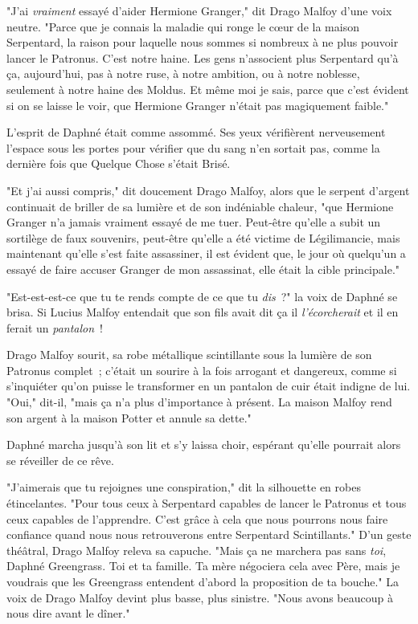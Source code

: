 "J'ai \emph{vraiment} essayé d'aider Hermione Granger," dit Drago Malfoy d'une voix neutre. "Parce que je connais la maladie qui ronge le cœur de la maison Serpentard, la raison pour laquelle nous sommes si nombreux à ne plus pouvoir lancer le Patronus. C'est notre haine. Les gens n'associent plus Serpentard qu'à ça, aujourd'hui, pas à notre ruse, à notre ambition, ou à notre noblesse, seulement à notre haine des Moldus. Et même moi je sais, parce que c'est évident si on se laisse le voir, que Hermione Granger n'était pas magiquement faible."

L'esprit de Daphné était comme assommé. Ses yeux vérifièrent nerveusement l'espace sous les portes pour vérifier que du sang n'en sortait pas, comme la dernière fois que Quelque Chose s'était Brisé.

"Et j'ai aussi compris," dit doucement Drago Malfoy, alors que le serpent d'argent continuait de briller de sa lumière et de son indéniable chaleur, "que Hermione Granger n'a jamais vraiment essayé de me tuer. Peut-être qu'elle a subit un sortilège de faux souvenirs, peut-être qu'elle a été victime de Légilimancie, mais maintenant qu'elle s'est faite assassiner, il est évident que, le jour où quelqu'un a essayé de faire accuser Granger de mon assassinat, elle était la cible principale."

"Est-est-est-ce que tu te rends compte de ce que tu \emph{dis}~?" la voix de Daphné se brisa. Si Lucius Malfoy entendait que son fils avait dit ça il \emph{l'écorcherait} et il en ferait un \emph{pantalon}~!

Drago Malfoy sourit, sa robe métallique scintillante sous la lumière de son Patronus complet~; c'était un sourire à la fois arrogant et dangereux, comme si s'inquiéter qu'on puisse le transformer en un pantalon de cuir était indigne de lui. "Oui," dit-il, "mais ça n'a plus d'importance à présent. La maison Malfoy rend son argent à la maison Potter et annule sa dette."

Daphné marcha jusqu'à son lit et s'y laissa choir, espérant qu'elle pourrait alors se réveiller de ce rêve.

"J'aimerais que tu rejoignes une conspiration," dit la silhouette en robes étincelantes. "Pour tous ceux à Serpentard capables de lancer le Patronus et tous ceux capables de l'apprendre. C'est grâce à cela que nous pourrons nous faire confiance quand nous nous retrouverons entre Serpentard Scintillants." D'un geste théâtral, Drago Malfoy releva sa capuche. "Mais ça ne marchera pas sans \emph{toi}, Daphné Greengrass. Toi et ta famille. Ta mère négociera cela avec Père, mais je voudrais que les Greengrass entendent d'abord la proposition de ta bouche." La voix de Drago Malfoy devint plus basse, plus sinistre. "Nous avons beaucoup à nous dire avant le dîner."

